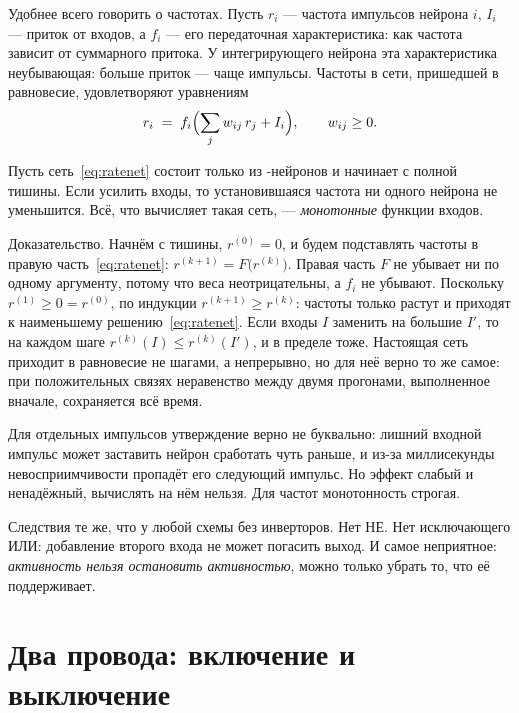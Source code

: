 Удобнее всего говорить о частотах. Пусть $r_i$ --- частота импульсов нейрона $i$, $I_i$ --- приток от входов, а $f_i$ --- его передаточная характеристика: как частота зависит от суммарного притока. У интегрирующего нейрона эта характеристика неубывающая: больше приток --- чаще импульсы. Частоты в сети, пришедшей в равновесие, удовлетворяют уравнениям
\begin{equation}
r_i \;=\; f_i\Bigl(\sum_j w_{ij}\,r_j + I_i\Bigr), \qquad w_{ij}\ge 0 .
\label{eq:ratenet}
\end{equation}

\begin{keyblock}
\begin{proposition}[Монотонность]
\label{prop:monotone}
Пусть сеть~\eqref{eq:ratenet} состоит только из -нейронов и начинает с полной тишины. Если усилить входы, то установившаяся частота ни одного нейрона не уменьшится. Всё, что вычисляет такая сеть, --- \emph{монотонные} функции входов.
\end{proposition}
\end{keyblock}

Доказательство. Начнём с тишины, $r^{(0)}=0$, и будем подставлять частоты в правую часть~\eqref{eq:ratenet}: $r^{(k+1)}=F\bigl(r^{(k)}\bigr)$. Правая часть $F$ не убывает ни по одному аргументу, потому что веса неотрицательны, а $f_i$ не убывают. Поскольку $r^{(1)}\ge0=r^{(0)}$, по индукции $r^{(k+1)}\ge r^{(k)}$: частоты только растут и приходят к наименьшему решению~\eqref{eq:ratenet}. Если входы $I$ заменить на большие $I'$, то на каждом шаге $r^{(k)}(I)\le r^{(k)}(I')$, и в пределе тоже. Настоящая сеть приходит в равновесие не шагами, а непрерывно, но для неё верно то же самое: при положительных связях неравенство между двумя прогонами, выполненное вначале, сохраняется всё время.

Для отдельных импульсов утверждение верно не буквально: лишний входной импульс может заставить нейрон сработать чуть раньше, и из-за миллисекунды невосприимчивости пропадёт его следующий импульс. Но эффект слабый и ненадёжный, вычислять на нём нельзя. Для частот монотонность строгая.

Следствия те же, что у любой схемы без инверторов. Нет НЕ. Нет исключающего ИЛИ: добавление второго входа не может погасить выход. И самое неприятное: \emph{активность нельзя остановить активностью}, можно только убрать то, что её поддерживает.

\section{Два провода: включение и выключение}

